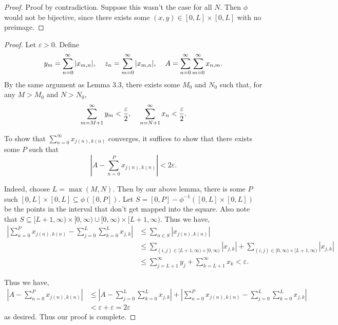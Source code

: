 \documentclass[12pt]{article}
\theoremstyle{remark}
\theoremstyle{named}
\newcommand{\e}{\varepsilon}
\newcommand{\bigabs}[1]{\left|#1\right|}
\begin{document}
\begin{proof}
    Proof by contradiction. Suppose this wasn't the case for all \(N\). Then \(\phi\) would not be bijective, since there exists some \((x, y) \in [0, L] \times [0, L]\) with no preimage.
\end{proof}

\begin{proof}
    Let \(\e > 0\). Define 
    \[y_m = \sum_{n = 0}^\infty|x_{m, n}|, \hspace*{4mm} z_n = \sum_{m = 0}^\infty |x_{m, n}|, \hspace{4mm} A = \sum_{n = 0}^\infty \sum_{m = 0}^\infty x_{n, m}.\]
    By the same argument as Lemma 3.3, there exists some \(M_0\) and \(N_0\) such that, for any \(M > M_0\) and \(N > N_0\),
    \[\sum_{m = M + 1}^\infty y_m < \frac{\e}{2}, \hspace*{4mm} \sum_{n = N + 1}^\infty x_n < \frac{\e}{2}.\]

    To show that \(\sum_{n = 0}^\infty x_{j(n), k(n)}\) converges, it suffices to show that there exists some \(P\) such that
    \[\bigabs{A - \sum_{n = 0}^P x_{j(n), k(n)}} < 2 \e.\]

    Indeed, choose \(L = \max(M, N)\). Then by our above lemma, there is some \(P\) such \([0, L] \times [0, L] \subseteq \phi([0, P])\). Let \(S = [0, P] - \phi^{-1}([0, L] \times [0, L])\) be the points in the interval that don't get mapped into the square. Also note that \(S \subseteq [L + 1, \infty) \times [0, \infty) \cup [0, \infty) \times [L + 1, \infty)\). Thus we have, 
    \begin{align*}
        \bigabs{\sum_{n = 0}^P x_{j(n), k(n)} - \sum_{j = 0}^L \sum_{k = 0}^L x_{j, k}} &\leq \sum_{n \in S} |x_{j(n), k(n)}| \\
        &\leq \sum_{(i, j) \in [L + 1, \infty) \times [0, \infty)} |x_{j, k}| + \sum_{(i, j) \in [0, \infty) \times [L + 1, \infty)} |x_{j, k}| \\
        &\leq \sum_{j = L + 1}^\infty y_j + \sum_{k = L + 1}^\infty x_k < \e.
    \end{align*}

    Thus we have, 
    \begin{align*}
        \bigabs{A - \sum_{n = 0}^P x_{j(n), k(n)}} &\leq \bigabs{A - \sum_{j = 0}^L \sum_{k = 0}^L x_{j, k}} + \bigabs{\sum_{n = 0}^P x_{j(n), k(n)} - \sum_{j = 0}^L \sum_{k = 0}^L x_{j, k}} \\
        &< \e + \e = 2\e
    \end{align*}
    as desired. Thus our proof is complete.
\end{proof}
\end{document}
